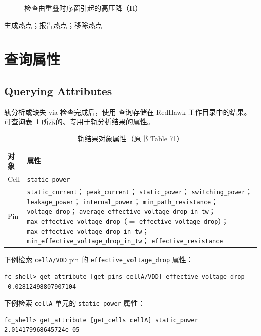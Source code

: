 \begin{figure}[htbp]
\centering
{}
\caption{检查由重叠时序窗引起的高压降（II）}
\label{fig:hotspot-tw2}
\end{figure}

\begin{seeAlsoBox}
生成热点；报告热点；移除热点
\end{seeAlsoBox}

\section{查询属性}
\subsection*{Querying Attributes}

轨分析或缺失 via 检查完成后，使用  查询存储在 RedHawk 工作目录中的结果。可查询表~\ref{tab:rail-attrs} 所示的、专用于轨分析结果的属性。

\begin{table}[htbp]
\centering
\caption{轨结果对象属性（原书 Table 71）}
\label{tab:rail-attrs}
\small
\begin{tabularx}{\textwidth}{@{}l X@{}}
\toprule
\textbf{对象} & \textbf{属性} \\
\midrule
Cell & \texttt{static\_power} \\
\midrule
Pin &
\texttt{static\_current}；
\texttt{peak\_current}；
\texttt{static\_power}；
\texttt{switching\_power}；
\texttt{leakage\_power}；
\texttt{internal\_power}；
\texttt{min\_path\_resistance}；
\texttt{voltage\_drop}；
\texttt{average\_effective\_voltage\_drop\_in\_tw}；
\texttt{max\_effective\_voltage\_drop}（$=$ \texttt{effective\_voltage\_drop}）；
\texttt{max\_effective\_voltage\_drop\_in\_tw}；
\texttt{min\_effective\_voltage\_drop\_in\_tw}；
\texttt{effective\_resistance} \\
\bottomrule
\end{tabularx}
\end{table}

下例检索 \texttt{cellA/VDD} pin 的 \texttt{effective\_voltage\_drop} 属性：
\begin{lstlisting}
fc_shell> get_attribute [get_pins cellA/VDD] effective_voltage_drop
-0.02812498807907104
\end{lstlisting}

下例检索 \texttt{cellA} 单元的 \texttt{static\_power} 属性：
\begin{lstlisting}
fc_shell> get_attribute [get_cells cellA] static_power
2.014179968645724e-05
\end{lstlisting}


